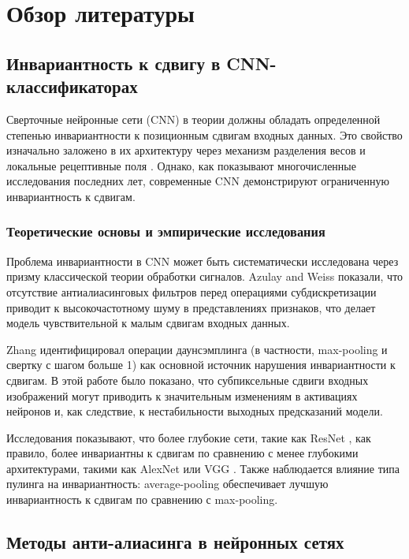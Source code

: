 \chapter{Обзор литературы} \label{review}

\section{Инвариантность к сдвигу в CNN-классификаторах}
\label{review:invariance}

Сверточные нейронные сети (CNN) в теории должны обладать определенной степенью инвариантности к позиционным сдвигам входных данных. Это свойство изначально заложено в их архитектуру через механизм разделения весов и локальные рецептивные поля \cite{LeCun1998}. Однако, как показывают многочисленные исследования последних лет, современные CNN демонстрируют ограниченную инвариантность к сдвигам.

\subsection{Теоретические основы и эмпирические исследования}
\label{review:invariance:theory}

Проблема инвариантности в CNN может быть систематически исследована через призму классической теории обработки сигналов. Azulay and Weiss \cite{Azulay2018} показали, что отсутствие антиалиасинговых фильтров перед операциями субдискретизации приводит к высокочастотному шуму в представлениях признаков, что делает модель чувствительной к малым сдвигам входных данных.

Zhang \cite{Zhang2019} идентифицировал операции даунсэмплинга (в частности, max-pooling и свертку с шагом больше 1) как основной источник нарушения инвариантности к сдвигам. В этой работе было показано, что субпиксельные сдвиги входных изображений могут приводить к значительным изменениям в активациях нейронов и, как следствие, к нестабильности выходных предсказаний модели.

Исследования показывают, что более глубокие сети, такие как ResNet \cite{He2016}, как правило, более инвариантны к сдвигам по сравнению с менее глубокими архитектурами, такими как AlexNet или VGG \cite{Simonyan2014}. Также наблюдается влияние типа пулинга на инвариантность: average-pooling обеспечивает лучшую инвариантность к сдвигам по сравнению с max-pooling.

\section{Методы анти-алиасинга в нейронных сетях}
\label{review:antialias}

